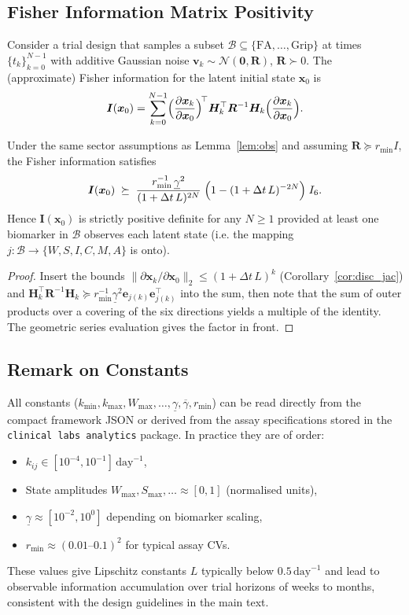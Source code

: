 \documentclass[11pt]{article}
\begin{document}
\subsection{Fisher Information Matrix Positivity}
\label{sub:fim}

Consider a trial design that samples a subset $\mathcal{B}\subseteq\{\text{FA},\dots,\text{Grip}\}$ at times $\{t_{k}\}_{k=0}^{N-1}$ with additive Gaussian noise $\bm{v}_{k}\sim\mathcal{N}(\bm{0},\bm{R})$, $\bm{R}\succ0$. The (approximate) Fisher information for the latent initial state $\bm{x}_{0}$ is
\[
\bm{I}(\bm{x}_{0})
=
\sum_{k=0}^{N-1}
\Bigl(\frac{\partial\bm{x}_{k}}{\partial\bm{x}_{0}}\Bigr)^{\!\top}
\bm{H}_{k}^{\top}\bm{R}^{-1}\bm{H}_{k}
\Bigl(\frac{\partial\bm{x}_{k}}{\partial\bm{x}_{0}}\Bigr).
\]

\begin{proposition}\label{prop:fim}
Under the same sector assumptions as Lemma~\ref{lem:obs} and assuming $\bm{R}\succeq r_{\min}I$, the Fisher information satisfies
\[
\bm{I}(\bm{x}_{0})\;\succeq\;
\frac{r_{\min}^{-1}\,\underline{\gamma}^{2}}{(1+\Delta t\,L)^{2N}}
\;\Bigl(1-(1+\Delta t\,L)^{-2N}\Bigr)\;I_{6}.
\]
Hence $\bm{I}(\bm{x}_{0})$ is strictly positive definite for any $N\ge1$ provided at least one biomarker in $\mathcal{B}$ observes each latent state (i.e. the mapping $j:\mathcal{B}\to\{W,S,I,C,M,A\}$ is onto).
\end{proposition}
\begin{proof}
Insert the bounds $\|\partial\bm{x}_{k}/\partial\bm{x}_{0}\|_{2}\le(1+\Delta t\,L)^{k}$ (Corollary~\ref{cor:disc_jac}) and $\bm{H}_{k}^{\top}\bm{R}^{-1}\bm{H}_{k}\succeq r_{\min}^{-1}\underline{\gamma}^{2}\bm{e}_{j(k)}\bm{e}_{j(k)}^{\top}$ into the sum, then note that the sum of outer products over a covering of the six directions yields a multiple of the identity. The geometric series evaluation gives the factor in front.
\end{proof}

\subsection{Remark on Constants}
All constants ($k_{\min},k_{\max},W_{\max},\dots,\underline{\gamma},\overline{\gamma},r_{\min}$) can be read directly from the compact framework JSON or derived from the assay specifications stored in the \texttt{clinical labs analytics} package. In practice they are of order:
\begin{itemize}
\item $k_{ij}\in[10^{-4},10^{-1}]\,\text{day}^{-1}$,
\item State amplitudes $W_{\max},S_{\max},\dots\approx[0,1]$ (normalised units),
\item $\underline{\gamma}\approx[10^{-2},10^{0}]$ depending on biomarker scaling,
\item $r_{\min}\approx(0.01\text{–}0.1)^{2}$ for typical assay CVs.
\end{itemize}
These values give Lipschitz constants $L$ typically below $0.5\,\text{day}^{-1}$ and lead to observable information accumulation over trial horizons of weeks to months, consistent with the design guidelines in the main text.
\nocite{*}


\end{document}
